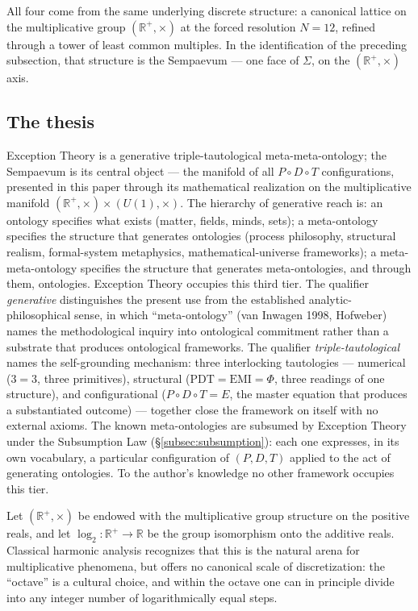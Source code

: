 \documentclass[11pt,a4paper]{article}
\theoremstyle{definition}
\theoremstyle{remark}
\newcommand{\R}{\mathbb{R}}
\begin{document}
All four come from the same underlying discrete structure: a canonical lattice on the multiplicative group $(\R^{+},\times)$ at the forced resolution $N=12$, refined through a tower of least common multiples. In the identification of the preceding subsection, that structure is the Sempaevum --- one face of $\Sigma$, on the $(\R^{+},\times)$ axis.

\subsection{The thesis}

Exception Theory is a generative triple-tautological meta-meta-ontology; the Sempaevum is its central object --- the manifold of all $P\circ D\circ T$ configurations, presented in this paper through its mathematical realization on the multiplicative manifold $(\R^{+},\times) \times (U(1),\times)$. The hierarchy of generative reach is: an ontology specifies what exists (matter, fields, minds, sets); a meta-ontology specifies the structure that generates ontologies (process philosophy, structural realism, formal-system metaphysics, mathematical-universe frameworks); a meta-meta-ontology specifies the structure that generates meta-ontologies, and through them, ontologies. Exception Theory occupies this third tier. The qualifier \emph{generative} distinguishes the present use from the established analytic-philosophical sense, in which ``meta-ontology'' (van Inwagen 1998, Hofweber) names the methodological inquiry into ontological commitment rather than a substrate that produces ontological frameworks. The qualifier \emph{triple-tautological} names the self-grounding mechanism: three interlocking tautologies --- numerical ($3 = 3$, three primitives), structural ($\mathrm{PDT} = \mathrm{EMI} = \Phi$, three readings of one structure), and configurational ($P \circ D \circ T = E$, the master equation that produces a substantiated outcome) --- together close the framework on itself with no external axioms. The known meta-ontologies are subsumed by Exception Theory under the Subsumption Law (\S\ref{subsec:subsumption}): each one expresses, in its own vocabulary, a particular configuration of $(P, D, T)$ applied to the act of generating ontologies. To the author's knowledge no other framework occupies this tier.

Let $(\R^{+},\times)$ be endowed with the multiplicative group structure on the positive reals, and let $\log_{2}:\R^{+}\to\R$ be the group isomorphism onto the additive reals. Classical harmonic analysis recognizes that this is the natural arena for multiplicative phenomena, but offers no canonical scale of discretization: the ``octave'' is a cultural choice, and within the octave one can in principle divide into any integer number of logarithmically equal steps.
\end{document}
